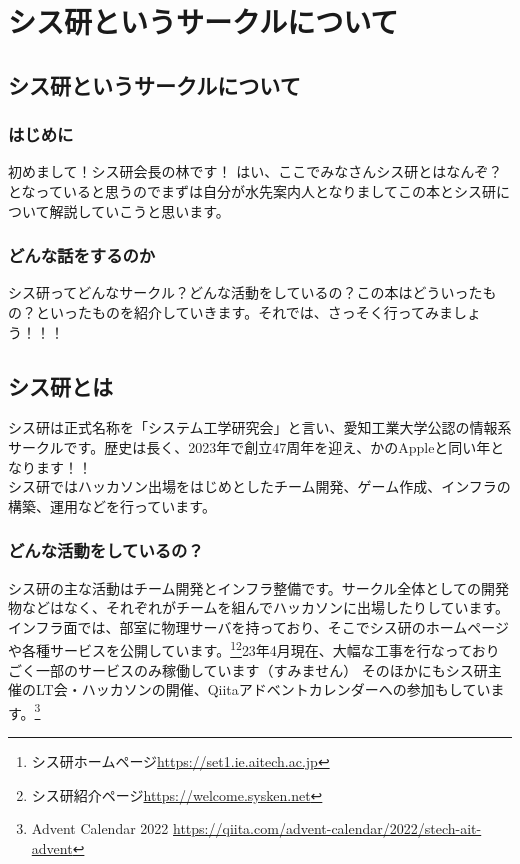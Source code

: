\chapter{シス研というサークルについて}

\section{シス研というサークルについて}
\subsection{はじめに}
初めまして！シス研会長の林です！
はい、ここでみなさんシス研とはなんぞ？となっていると思うのでまずは自分が水先案内人となりましてこの本とシス研について解説していこうと思います。

\subsection{どんな話をするのか}
シス研ってどんなサークル？どんな活動をしているの？この本はどういったもの？といったものを紹介していきます。それでは、さっそく行ってみましょう！！！

\section{シス研とは}
シス研は正式名称を「システム工学研究会」と言い、愛知工業大学公認の情報系サークルです。歴史は長く、2023年で創立47周年を迎え、かのAppleと同い年となります！！ \\
シス研ではハッカソン出場をはじめとしたチーム開発、ゲーム作成、インフラの構築、運用などを行っています。

\subsection{どんな活動をしているの？}
シス研の主な活動はチーム開発とインフラ整備です。サークル全体としての開発物などはなく、それぞれがチームを組んでハッカソンに出場したりしています。 \\
インフラ面では、部室に物理サーバを持っており、そこでシス研のホームページや各種サービスを公開しています。\footnote{シス研ホームページ\url{https://set1.ie.aitech.ac.jp}}\footnote{シス研紹介ページ\url{https://welcome.sysken.net}}23年4月現在、大幅な工事を行なっておりごく一部のサービスのみ稼働しています（すみません）
そのほかにもシス研主催のLT会・ハッカソンの開催、Qiitaアドベントカレンダーへの参加もしています。\footnote{Advent Calendar 2022 \url{https://qiita.com/advent-calendar/2022/stech-ait-advent}}

